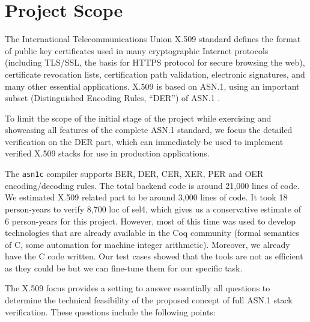 \documentclass[10p,conference]{IEEEtran}
\begin{document}
\section{Project Scope}

The International Telecommunications Union X.509 standard
\cite{X509} defines the format of public key certificates used in
many cryptographic Internet protocols (including TLS/SSL, the basis
for HTTPS protocol for secure browsing the web), certificate
revocation lists, certification path validation, electronic
signatures, and many other essential applications. X.509 is based on
ASN.1, using an important subset (Distinguished
Encoding Rules, ``DER'') of ASN.1 \cite{BERandDER}.

To limit the scope of the initial stage of the project while
exercising and showcasing all features of the complete ASN.1
standard, we focus the detailed verification on the DER part,
which can immediately be used to implement verified X.509
stacks for use in production applications.

The \texttt{asn1c} compiler supports BER, DER, CER, XER, PER and OER encoding/decoding rules. The total backend code is around 21,000 lines of code. We estimated X.509 related part to be around 3,000 lines of code. It took 18 person-years to verify 8,700 loc of sel4\cite{VNSSforSel4}, which gives us a conservative estimate of 6 person-years for this project. However, most of this time was used to develop technologies that are already available in the Coq community (formal semantics of C, some automation for machine integer arithmetic). Moreover, we already have the C code written. Our test cases showed that the tools are not as efficient as they could be but we can fine-tune them for our specific task. 


The X.509 focus provides a setting to answer essentially all questions
to determine the technical feasibility of the
proposed concept of full ASN.1 stack verification. These questions
include the following points:
\end{document}
